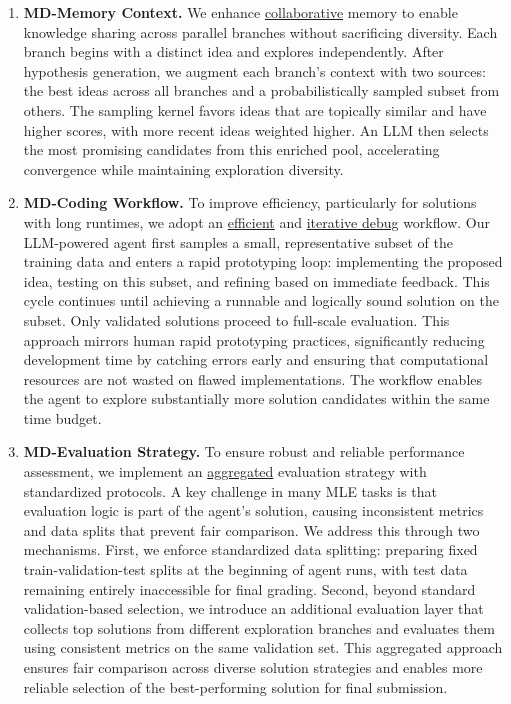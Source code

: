 \begin{enumerate}[leftmargin=4ex]
\item [\ding{185}] \textbf{MD-Memory Context.} 
We enhance \uline{collaborative} memory to enable knowledge sharing across parallel branches without sacrificing diversity. Each branch begins with a distinct idea and explores independently. After hypothesis generation, we augment each branch's context with two sources: the best ideas across all branches and a probabilistically sampled subset from others. The sampling kernel favors ideas that are topically similar and have higher scores, with more recent ideas weighted higher. An LLM then selects the most promising candidates from this enriched pool, accelerating convergence while maintaining exploration diversity.

\item [\ding{186}] \textbf{MD-Coding Workflow.} To improve efficiency, particularly for solutions with long runtimes, we adopt an \uline{efficient} and \uline{iterative debug} workflow. Our LLM-powered agent first samples a small, representative subset of the training data and enters a rapid prototyping loop: implementing the proposed idea, testing on this subset, and refining based on immediate feedback. This cycle continues until achieving a runnable and logically sound solution on the subset. Only validated solutions proceed to full-scale evaluation. This approach mirrors human rapid prototyping practices, significantly reducing development time by catching errors early and ensuring that computational resources are not wasted on flawed implementations. The workflow enables the agent to explore substantially more solution candidates within the same time budget.


\item [\ding{187}] \textbf{MD-Evaluation Strategy.} To ensure robust and reliable performance assessment, we implement an \uline{aggregated} evaluation strategy with standardized protocols. A key challenge in many MLE tasks is that evaluation logic is part of the agent's solution, causing inconsistent metrics and data splits that prevent fair comparison. We address this through two mechanisms. First, we enforce standardized data splitting: preparing fixed train-validation-test splits at the beginning of agent runs, with test data remaining entirely inaccessible for final grading. Second, beyond standard validation-based selection, we introduce an additional evaluation layer that collects top solutions from different exploration branches and evaluates them using consistent metrics on the same validation set. This aggregated approach ensures fair comparison across diverse solution strategies and enables more reliable selection of the best-performing solution for final submission.
\end{enumerate}

